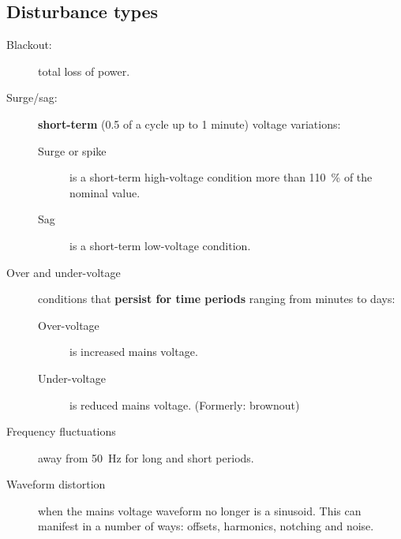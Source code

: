 \documentclass{pgnotes}
\begin{document}
\subsection{Disturbance types}

\begin{description}
\item[Blackout:] total loss of power.
\item[Surge/sag:] \textbf{short-term} (0.5 of a cycle up to 1 minute) voltage variations:
\begin{description}
\item[Surge or spike] is a short-term high-voltage condition more than \SI{110}{\percent} of the nominal value.
\item[Sag] is a short-term low-voltage condition.
\end{description}

\item[Over and under-voltage] conditions that \textbf{persist for time periods} ranging from minutes to days:
\begin{description}
\item[Over-voltage] is increased mains voltage.
\item[Under-voltage] is reduced mains voltage.  (Formerly: brownout)
\end{description}

\item[Frequency fluctuations] away from \SI{50}{\hertz} for long and short periods.

\item[Waveform distortion] when the mains voltage waveform no longer is a sinusoid.
This can manifest in a number of ways: offsets, harmonics, notching and noise.

\end{description}
\newpage
\end{document}
